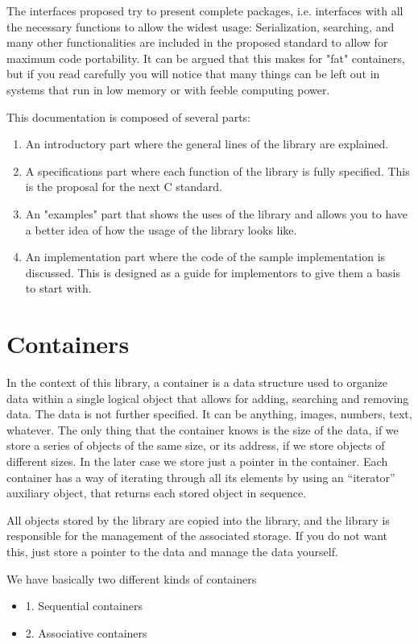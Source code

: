 \documentclass[12pt,a4paper]{memoir} %
\begin{document}
The interfaces proposed try to present complete packages, i.e. interfaces with all the necessary functions to allow the widest usage: Serialization, searching, and many other functionalities are included in the proposed standard to allow for maximum code portability. It can be argued that this makes  for "fat" containers, but if you read carefully you will notice that many things can be left out in systems that run in low memory or with feeble computing power.

This documentation is composed of several parts:
\begin{enumerate}
\item An introductory part where the general lines of the library are explained.
\item A specifications part where each function of the library is fully specified. This is the proposal for the next C standard.
\item An "examples" part that shows the uses of the library and allows you to have a better idea of how the usage of the library looks like.
\item An implementation part where the code of the sample implementation is discussed. This is designed as a guide for implementors to give them a basis to start with.
\end{enumerate}
\section{Containers}
In the context of this library, a container is a data structure used to organize data within a single logical object that allows for adding, searching and removing data. The data is not further specified. It can be anything, images, numbers, text, whatever. The only thing that the container knows is the size of the data, if we store a series of objects of the same size, or its address, if we store objects of different sizes. In the later case we store just a pointer in the container.
Each container has a way of iterating through all its elements by using an “iterator” auxiliary object, that returns each stored object in sequence.

All objects stored by the library are copied into the library, and the library is responsible for the management of the associated storage. If you do not want this, just store a pointer to the data and manage the data yourself.

We have basically two different kinds of containers
\begin{itemize}
\item
1. Sequential containers
\item
2. Associative containers
\end{itemize}
\end{document}
